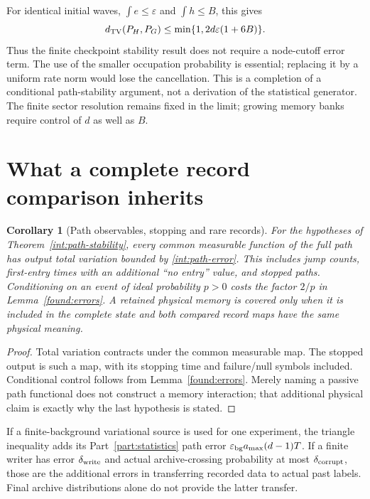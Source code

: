 \documentclass[11pt,oneside,openany]{book}
\newtheorem{corollary}[theorem]{Corollary}
\theoremstyle{definition}
\theoremstyle{remark}\newtheorem{remark}[theorem]{Remark}
\begin{document}
For identical initial waves, $\int e\le\varepsilon$ and $\int h\le B$, this gives
\begin{equation}\label{int:simple-error}
 d_{\rm TV}(P_H,P_G)\le\min\{1,2d\varepsilon(1+6B)\}.
\end{equation}
Thus the finite checkpoint stability result does not require a node-cutoff error term. The use of the smaller occupation probability is essential; replacing it by a uniform rate norm would lose the cancellation. This is a completion of a conditional path-stability argument, not a derivation of the statistical generator. The finite sector resolution remains fixed in the limit; growing memory banks require control of $d$ as well as $B$.

\section{What a complete record comparison inherits}
\begin{corollary}[Path observables, stopping and rare records]\label{int:path-records}
For the hypotheses of Theorem~\ref{int:path-stability}, every common measurable function of the full path has output total variation bounded by \eqref{int:path-error}. This includes jump counts, first-entry times with an additional ``no entry'' value, and stopped paths. Conditioning on an event of ideal probability $p>0$ costs the factor $2/p$ in Lemma~\ref{found:errors}. A retained physical memory is covered only when it is included in the complete state and both compared record maps have the same physical meaning.
\end{corollary}
\begin{proof}
Total variation contracts under the common measurable map. The stopped output is such a map, with its stopping time and failure/null symbols included. Conditional control follows from Lemma~\ref{found:errors}. Merely naming a passive path functional does not construct a memory interaction; that additional physical claim is exactly why the last hypothesis is stated.
\end{proof}

If a finite-background variational source is used for one experiment, the triangle inequality adds its Part~\ref{part:statistics} path error $\varepsilon_{\rm bg}a_{\max}(d-1)T$. If a finite writer has error $\delta_{\rm write}$ and actual archive-crossing probability at most $\delta_{\rm corrupt}$, those are the additional errors in transferring recorded data to actual past labels. Final archive distributions alone do not provide the latter transfer.
\end{document}
